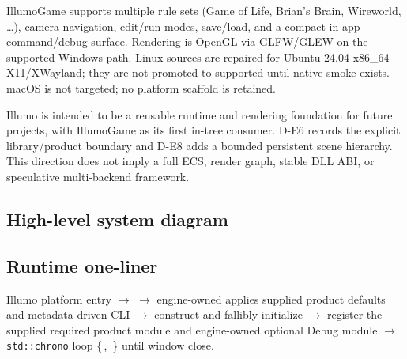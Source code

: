 IllumoGame supports multiple rule sets (Game of Life, Brian's Brain,
Wireworld, \ldots), camera navigation, edit/run modes, save/load, and a compact
in-app command/debug surface. Rendering is OpenGL via GLFW/GLEW on the supported
Windows path. Linux sources are repaired for Ubuntu 24.04 x86\_64
X11/XWayland; they are not promoted to supported until native smoke exists.
macOS is not targeted; no platform scaffold is retained.

\begin{inferencebox}
Illumo is intended to be a reusable runtime and rendering foundation for
future projects, with IllumoGame as its first in-tree consumer. D-E6 records
the explicit library/product boundary and D-E8 adds a bounded persistent scene
hierarchy. This direction does not imply a full ECS, render graph, stable DLL
ABI, or speculative multi-backend framework.
\end{inferencebox}

\subsection{High-level system diagram}

\begin{center}
\end{center}

\subsection{Runtime one-liner}
Illumo platform entry $\rightarrow$ 
$\rightarrow$ engine-owned  applies supplied
product defaults and metadata-driven CLI $\rightarrow$ construct and fallibly
initialize  $\rightarrow$ register the supplied required product
module and engine-owned optional Debug module $\rightarrow$ \texttt{std::chrono} loop
\{\,, \,\} until window close.

